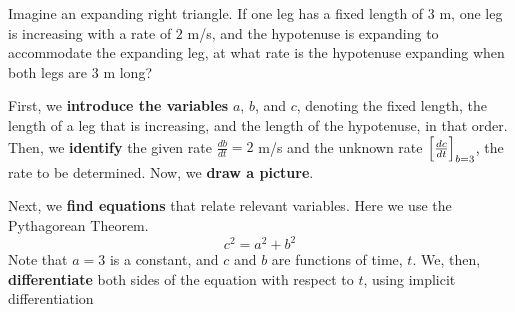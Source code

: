 \documentclass{ximera}
\begin{document}
\begin{example}
  Imagine an expanding right triangle. If one leg has a fixed length
  of $3$ m, one leg is increasing with a rate of $2$ m/s, and the
  hypotenuse is expanding to accommodate the expanding leg, at what
  rate is the hypotenuse expanding when both legs are $3$ m long?
  \begin{explanation}
 First, we \textbf{introduce the variables}  $a$, $b$, and $c$, denoting the fixed length, the length of a leg that is increasing, 
 and  the length of the hypotenuse, in that order. Then, we \textbf{identify} the given rate $\frac{db}{dt}=2$ m/s and the unknown rate $\Bigl[\frac{dc}{dt}\Bigr]_{b=3}$, the rate to be determined.
   Now, we \textbf{draw a picture}.
    \begin{image}
    \end{image}

    Next, we  \textbf{find equations} that relate relevant
    variables. Here we use the Pythagorean Theorem.
    \[
    c^2 = a^2 + b^2
    \]
   Note that $a=3$ is a constant, and $c$ and $b$ are functions of time, $t$.
    We, then, \textbf{differentiate} both sides of the equation with respect to $t$,  using  implicit differentiation
  

\end{explanation}
\end{example}
\end{document}
